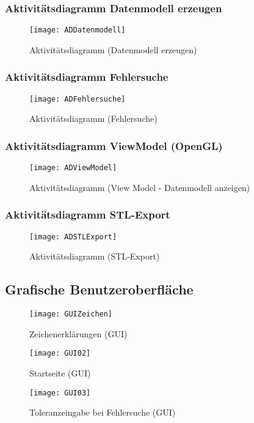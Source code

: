 \documentclass[fontsize=10pt, listof = totoc]{scrartcl}
\begin{document}
\subsubsection{Aktivitätsdiagramm Datenmodell erzeugen}
\begin{figure}[H]
\centering
\texttt{[image: ADDatenmodell]}
\caption{Aktivitätsdiagramm (Datenmodell erzeugen)}
\end{figure}

\subsubsection{Aktivitätsdiagramm Fehlersuche}
\begin{figure}[H]
\centering
\texttt{[image: ADFehlersuche]}
\caption{Aktivitätsdiagramm (Fehlersuche)}
\end{figure}
\subsubsection{Aktivitätsdiagramm ViewModel (OpenGL)}
\begin{figure}[H]
\centering
\texttt{[image: ADViewModel]}
\caption{Aktivitätsdiagramm (View Model - Datenmodell anzeigen)}
\end{figure}
\subsubsection{Aktivitätsdiagramm STL-Export}
\begin{figure}[H]
\centering
\texttt{[image: ADSTLExport]}
\caption{Aktivitätsdiagramm (STL-Export)}
\end{figure}
\newpage
\subsection{Grafische Benutzeroberfläche}
\begin{figure}[H]
\centering
\texttt{[image: GUIZeichen]}
\caption{Zeichenerklärungen (GUI)}
\end{figure}

\begin{figure}[H]
\centering
\texttt{[image: GUI02]}
\caption{Startseite (GUI)}
\end{figure}

\begin{figure}[H]
\centering
\texttt{[image: GUI03]}
\caption{Toleranzeingabe bei Fehlersuche (GUI)}
\end{figure}
\end{document}
